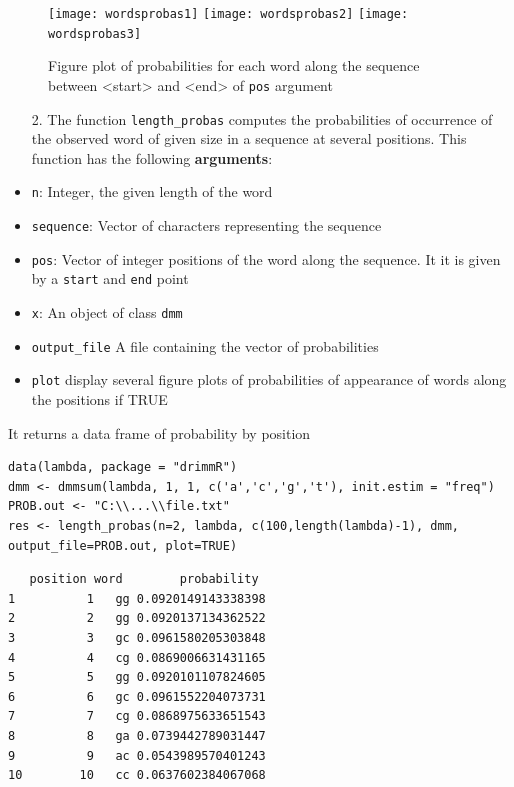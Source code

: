 \documentclass[article,nojss]{jss}\usepackage[]{graphicx}\usepackage[]{color}
\begin{document}
\begin{figure}[htbp]
\centering
\texttt{[image: wordsprobas1]}
\texttt{[image: wordsprobas2]}
\texttt{[image: wordsprobas3]}
\caption{Figure plot of probabilities for each word along the sequence between <start> and <end> of {\tt pos} argument} \label{wordprobas}
\end{figure}

\clearpage

\begin{enumerate}
	\item[2.] The function \verb|length_probas| computes the probabilities of occurrence of the observed word of given size in a sequence at several positions. This function has the following {\bf arguments}:
	\end{enumerate}
%
\begin{itemize}
\item {\tt n}: Integer, the given length of the word
\item {\tt sequence}: Vector of characters representing the sequence
\item {\tt pos}: Vector of integer positions of the word along the sequence. It it is given by a {\tt start} and {\tt end} point
\item {\tt x}: An object of class {\tt dmm}
\item {\tt output\_file} A file containing the vector of probabilities
\item {\tt plot} display several figure plots of probabilities of appearance of words along the positions if TRUE
\end{itemize}
%
It returns a data frame of probability by position \\

\begin{lstlisting}
data(lambda, package = "drimmR")
dmm <- dmmsum(lambda, 1, 1, c('a','c','g','t'), init.estim = "freq")
PROB.out <- "C:\\...\\file.txt"
res <- length_probas(n=2, lambda, c(100,length(lambda)-1), dmm,
output_file=PROB.out, plot=TRUE)
\end{lstlisting}


\begin{lstlisting}
   position word        probability
1          1   gg 0.0920149143338398
2          2   gg 0.0920137134362522
3          3   gc 0.0961580205303848
4          4   cg 0.0869006631431165
5          5   gg 0.0920101107824605
6          6   gc 0.0961552204073731
7          7   cg 0.0868975633651543
8          8   ga 0.0739442789031447
9          9   ac 0.0543989570401243
10        10   cc 0.0637602384067068
\end{lstlisting}
\end{document}
